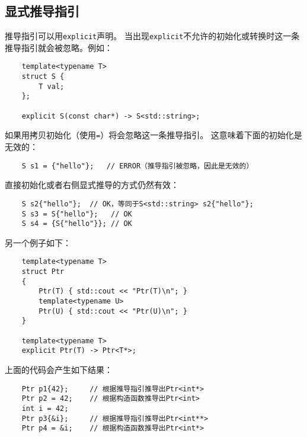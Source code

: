 \subsection{显式推导指引}
推导指引可以用\texttt{explicit}声明。
当出现\texttt{explicit}不允许的初始化或转换时这一条推导指引就会被忽略。例如：
\begin{lstlisting}
    template<typename T>
    struct S {
        T val;
    };

    explicit S(const char*) -> S<std::string>;
\end{lstlisting}
如果用拷贝初始化（使用\texttt{=}）将会忽略这一条推导指引。
这意味着下面的初始化是无效的：
\begin{lstlisting}
    S s1 = {"hello"};   // ERROR（推导指引被忽略，因此是无效的）
\end{lstlisting}
直接初始化或者右侧显式推导的方式仍然有效：
\begin{lstlisting}
    S s2{"hello"};  // OK，等同于S<std::string> s2{"hello"};
    S s3 = S{"hello"};   // OK
    S s4 = {S{"hello"}}; // OK
\end{lstlisting}
另一个例子如下：
\begin{lstlisting}
    template<typename T>
    struct Ptr
    {
        Ptr(T) { std::cout << "Ptr(T)\n"; }
        template<typename U>
        Ptr(U) { std::cout << "Ptr(U)\n"; }
    }

    template<typename T>
    explicit Ptr(T) -> Ptr<T*>;
\end{lstlisting}
上面的代码会产生如下结果：
\begin{lstlisting}
    Ptr p1{42};     // 根据推导指引推导出Ptr<int*>
    Ptr p2 = 42;    // 根据构造函数推导出Ptr<int>
    int i = 42;
    Ptr p3{&i};     // 根据推导指引推导出Ptr<int**>
    Ptr p4 = &i;    // 根据构造函数推导出Ptr<int*>
\end{lstlisting}

